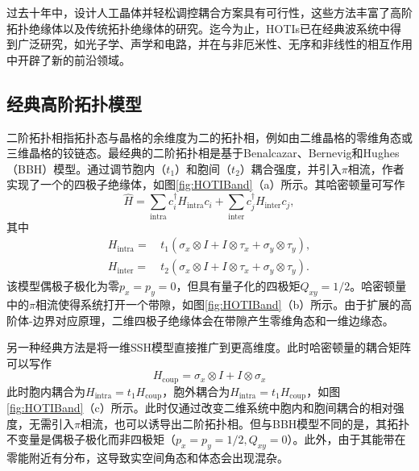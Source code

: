 过去十年中，设计人工晶体并轻松调控耦合方案具有可行性，这些方法丰富了高阶拓扑绝缘体以及传统拓扑绝缘体的研究。迄今为止，HOTIs已在经典波系统中得到广泛研究，如光子学\cite{peterson2018quantized,xie2018second,chen2019direct,xie2019visualization,mittal2019photonic,ota2019photonic,el2019corner,he2020quadrupole,zhang2020higher,li2020higher}、声学\cite{serra2018observation,zhang2019dimensional,xue2019realization,qi2020acoustic,xue2020observation,weiner2020demonstration,ni2020demonstration}和电路\cite{imhof2018topolectrical,bao2019topoelectrical,zhang2019dimensional,liu2020octupole,zhang2021experimental}，并在与非厄米性\cite{luo2019higher,gao2021non}、无序\cite{zhang2021experimental,chen2020higher,li2020topological}和非线性\cite{zangeneh2019nonlinear,kirsch2021nonlinear}的相互作用中开辟了新的前沿领域。
\subsection{经典高阶拓扑模型}
二阶拓扑相指拓扑态与晶格的余维度为二的拓扑相，例如由二维晶格的零维角态或三维晶格的铰链态。最经典的二阶拓扑相是基于Benalcazar、Bernevig和Hughes（BBH）模型\cite{benalcazar2017quantized}。通过调节胞内（$t_1$）和胞间（$t_2$）耦合强度，并引入$\pi$相流，作者实现了一个的四极子绝缘体，如图\ref{fig:HOTIBand}（a）所示。其哈密顿量可写作
\begin{equation}
\hat{H} = \sum_\text{intra} c_i^\dagger H_\text{intra} c_i + \sum_\text{inter} c_j^\dagger H_\text{inter} c_j,
\end{equation}
其中
\begin{equation}
\begin{aligned}
H_\text{intra} = & \, t_1 (\sigma_x \otimes I + I \otimes \tau_x + \sigma_y \otimes \tau_y), \\
H_\text{inter} = & \, t_2 (\sigma_x \otimes I + I \otimes \tau_x + \sigma_y \otimes \tau_y).
\end{aligned}
\end{equation}
该模型偶极子极化为零$p_x=p_y=0$，但具有量子化的四极矩$Q_{xy}=1/2$。哈密顿量中的$\pi$相流使得系统打开一个带隙，如图\ref{fig:HOTIBand}（b）所示。由于扩展的高阶体-边界对应原理，二维四极子绝缘体会在带隙产生零维角态和一维边缘态。

另一种经典方法是将一维SSH模型直接推广到更高维度\cite{noh2018topological,ni2019observation,zhang2019second,xue2019acoustic,zhang2020low}。此时哈密顿量的耦合矩阵可以写作
\begin{equation}
H_{\text{coup}} = \sigma_x \otimes I + I \otimes \sigma_x
\end{equation}
此时胞内耦合为$H_\text{intra}=t_1H_{\text{coup}}$，胞外耦合为$H_\text{intra}=t_1H_{\text{coup}}$，如图\ref{fig:HOTIBand}（c）所示。此时仅通过改变二维系统中胞内和胞间耦合的相对强度，无需引入$\pi$相流，也可以诱导出二阶拓扑相。但与BBH模型不同的是，其拓扑不变量是偶极子极化而非四极矩（$p_x=p_y=1/2, Q_{xy}=0$）。此外，由于其能带在零能附近有分布，这导致实空间角态和体态会出现混杂。


